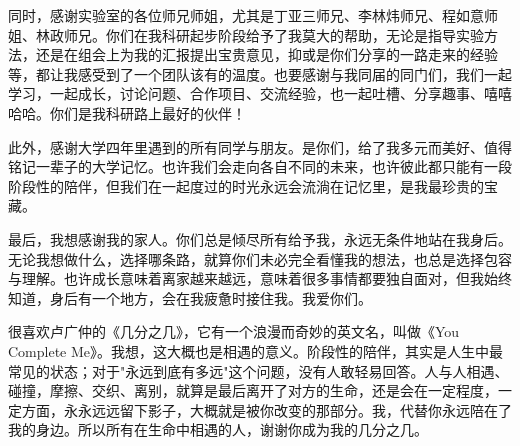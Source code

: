 \begin{acknowledgements}
同时，感谢实验室的各位师兄师姐，尤其是丁亚三师兄、李林炜师兄、程如意师姐、林政师兄。你们在我科研起步阶段给予了我莫大的帮助，无论是指导实验方法，还是在组会上为我的汇报提出宝贵意见，抑或是你们分享的一路走来的经验等，都让我感受到了一个团队该有的温度。也要感谢与我同届的同门们，我们一起学习，一起成长，讨论问题、合作项目、交流经验，也一起吐槽、分享趣事、嘻嘻哈哈。你们是我科研路上最好的伙伴！

此外，感谢大学四年里遇到的所有同学与朋友。是你们，给了我多元而美好、值得铭记一辈子的大学记忆。也许我们会走向各自不同的未来，也许彼此都只能有一段阶段性的陪伴，但我们在一起度过的时光永远会流淌在记忆里，是我最珍贵的宝藏。

最后，我想感谢我的家人。你们总是倾尽所有给予我，永远无条件地站在我身后。无论我想做什么，选择哪条路，就算你们未必完全看懂我的想法，也总是选择包容与理解。也许成长意味着离家越来越远，意味着很多事情都要独自面对，但我始终知道，身后有一个地方，会在我疲惫时接住我。我爱你们。

很喜欢卢广仲的《几分之几》，它有一个浪漫而奇妙的英文名，叫做《You Complete Me》。我想，这大概也是相遇的意义。阶段性的陪伴，其实是人生中最常见的状态；对于"永远到底有多远"这个问题，没有人敢轻易回答。人与人相遇、碰撞，摩擦、交织、离别，就算是最后离开了对方的生命，还是会在一定程度，一定方面，永永远远留下影子，大概就是被你改变的那部分。我，代替你永远陪在了我的身边。所以所有在生命中相遇的人，谢谢你成为我的几分之几。
\end{acknowledgements}
